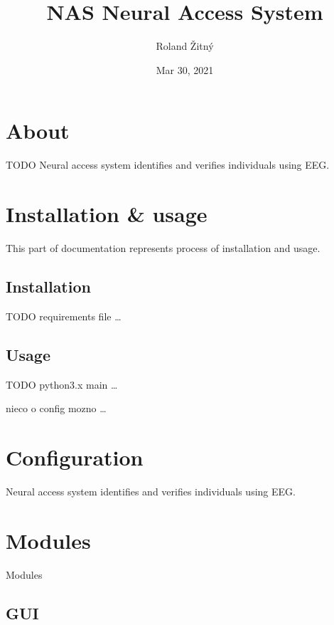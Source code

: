 \documentclass[letterpaper,10pt,english]{sphinxmanual}
\title{NAS \sphinxhyphen{} Neural Access System}
\date{Mar 30, 2021}
\author{Roland Žitný}
\begin{document}
\pagestyle{empty}
\sphinxmaketitle
\pagestyle{plain}
\sphinxtableofcontents
\pagestyle{normal}
\label{\detokenize{index::doc}}



\chapter{About}
\label{\detokenize{about:about}}\label{\detokenize{about::doc}}
\sphinxAtStartPar
TODO Neural access system identifies and verifies individuals using EEG.


\chapter{Installation \& usage}
\label{\detokenize{inst_usage:installation-usage}}\label{\detokenize{inst_usage::doc}}
\sphinxAtStartPar
This part of documentation represents process of installation and usage.


\section{Installation}
\label{\detokenize{inst_usage:installation}}
\sphinxAtStartPar
TODO requirements file …


\section{Usage}
\label{\detokenize{inst_usage:usage}}
\sphinxAtStartPar
TODO python3.x main …

\sphinxAtStartPar
nieco o config mozno …


\chapter{Configuration}
\label{\detokenize{configuration:configuration}}\label{\detokenize{configuration::doc}}
\sphinxAtStartPar
Neural access system identifies and verifies individuals using EEG.


\chapter{Modules}
\label{\detokenize{modules:modules}}\label{\detokenize{modules::doc}}
\sphinxAtStartPar
Modules


\section{GUI}
\label{\detokenize{modules:gui}}
\end{document}
